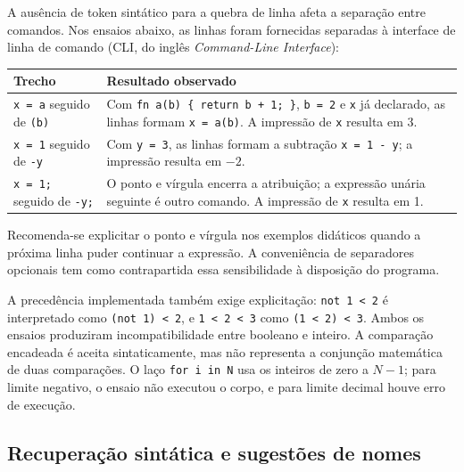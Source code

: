 A ausência de token sintático para a quebra de linha afeta a separação entre
comandos. Nos ensaios abaixo, as linhas foram fornecidas separadas à interface de linha de comando
(CLI, do inglês \textit{Command-Line Interface}):

\begin{quadro}[htb]
\centering
{}
\footnotesize
\begin{tabular}{|P{4.2cm}|P{8.8cm}|}
\hline
Trecho & Resultado observado \\
\hline\hline
\texttt{x = a} seguido de \texttt{(b)} & Com \texttt{fn a(b) \{ return b + 1; \}}, \texttt{b = 2} e \texttt{x} já declarado, as linhas formam \texttt{x = a(b)}. A impressão de \texttt{x} resulta em 3. \\
\hline
\texttt{x = 1} seguido de \texttt{-y} & Com \texttt{y = 3}, as linhas formam a subtração \texttt{x = 1 - y}; a impressão resulta em $-2$. \\
\hline
\texttt{x = 1;} seguido de \texttt{-y;} & O ponto e vírgula encerra a atribuição; a expressão unária seguinte é outro comando. A impressão de \texttt{x} resulta em 1. \\
\hline
\end{tabular}
\vspace{0.2cm}
\end{quadro}
\FloatBarrier

Recomenda-se explicitar o ponto e vírgula nos exemplos didáticos quando a próxima
linha puder continuar a expressão. A conveniência de separadores opcionais tem
como contrapartida essa sensibilidade à disposição do programa.

A precedência implementada também exige explicitação: \texttt{not 1 < 2}
é interpretado como \texttt{(not 1) < 2}, e \texttt{1 < 2 < 3} como
\texttt{(1 < 2) < 3}. Ambos os ensaios produziram incompatibilidade entre
booleano e inteiro. A comparação encadeada é aceita sintaticamente, mas não
representa a conjunção matemática de duas comparações. O laço
\texttt{for i in N} usa os inteiros de zero a $N-1$; para limite negativo, o
ensaio não executou o corpo, e para limite decimal houve erro de execução.


\subsection{Recuperação sintática e sugestões de nomes}
\label{sec:recuperacao_sugestoes}

